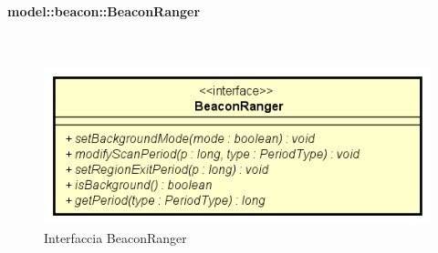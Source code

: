 \documentclass[../DefinizioneDiProdotto.tex]{subfiles}
\begin{document}
\paragraph{model::beacon::BeaconRanger}
\
\begin{figure}[H]
	\centering
	\includegraphics[width=\maxwidth]{img/BeaconRanger.png}
	\caption{Interfaccia BeaconRanger}\label{fig:model::beacon::BeaconRanger} 
\end{figure}
\end{document}
